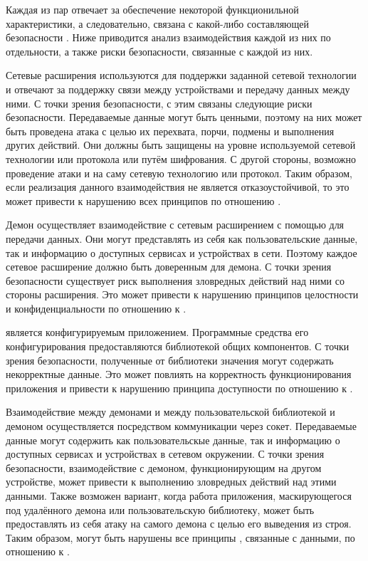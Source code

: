 Каждая из пар отвечает за обеспечение некоторой функционильной характеристики, а следовательно, связана с какой-либо составляющей безопасности . 
%
Ниже приводится анализ взаимодействия каждой из них по отдельности, а также риски безопасности, связанные с каждой из них. 

%
Сетевые расширения используются для поддержки заданной сетевой технологии и отвечают за поддержку связи между устройствами и передачу данных между ними. 
%
С точки зрения безопасности, с этим связаны следующие риски безопасности. 
%
Передаваемые данные могут быть ценными, поэтому на них может быть проведена атака с целью их перехвата, порчи, подмены и выполнения других действий. 
%
Они должны быть защищены на уровне используемой сетевой технологии или протокола или путём шифрования. 
%
С другой стороны, возможно проведение атаки и на саму сетевую технологию или протокол. 
%
Таким образом, если реализация данного взаимодействия не является отказоустойчивой, то это может привести к нарушению всех принципов  по отношению . 

%
Демон осуществляет взаимодействие с сетевым расширением с помощью  для передачи данных. 
%
Они могут представлять из себя как пользовательские данные, так и информацию о доступных сервисах и устройствах в сети. 
%
Поэтому каждое сетевое расширение должно быть доверенным для демона.
%
С точки зрения безопасности существует риск выполнения зловредных действий над ними со стороны расширения. 
%
Это может привести к нарушению принципов целостности и конфиденциальности по отношению к . 

%
 является конфигурируемым приложением. 
%
Программные средства его конфигурирования предоставляются библиотекой общих компонентов. 
%
С точки зрения безопасности, полученные от библиотеки значения могут содержать некорректные данные. 
%
Это может повлиять на корректность функционирования приложения и привести к нарушению принципа доступности по отношению к . 

%
Взаимодействие между демонами и между пользовательской библиотекой и демоном осуществляется посредством коммуникации через сокет. 
%
Передаваемые данные могут содержить как пользовательскые данные, так и информацию о доступных сервисах и устройствах в сетевом окружении. 
%
С точки зрения безопасности, взаимодействие с демоном, функционирующим на другом устройстве, может привести к выполнению зловредных действий над этими данными. 
%
Также возможен вариант, когда работа приложения, маскирующегося под удалённого демона или пользовательскую библиотеку, может быть предоставлять из себя атаку на самого демона с целью его выведения из строя. 
%
Таким образом, могут быть нарушены все принципы , связанные с данными, по отношению к . 

